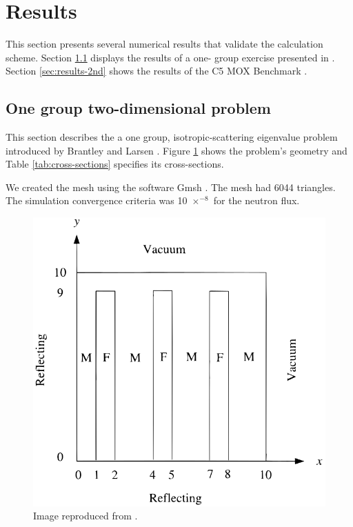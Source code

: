 \documentclass{anstrans}
\begin{document}
\section{Results}

This section presents several numerical results that validate the calculation scheme.
Section \ref{sec:results-1st} displays the results of a one- group exercise presented in \cite{brantley_simplifiedP3_2000}.
Section \ref{sec:results-2nd} shows the results of the C5 MOX Benchmark \cite{cavarec_benchmark_1994}.

\subsection{One group two-dimensional problem}
\label{sec:results-1st}

This section describes the a one group, isotropic-scattering eigenvalue problem introduced by Brantley and Larsen \cite{brantley_simplifiedP3_2000}.
Figure \ref{fig:2D} shows the problem's geometry and Table \ref{tab:cross-sections} specifies its cross-sections.

We created the mesh using the software Gmsh \cite{geuzaine_gmsh_2009}.
The mesh had 6044 triangles.
The simulation convergence criteria was 10 $\times ^{-8}$ for the neutron flux.

\begin{figure}[htbp!] %
    \centering
    \includegraphics[width=0.95\linewidth]{figures/brantley-larsen.png}
    \hfill
    \caption{Image reproduced from \cite{brantley_simplifiedP3_2000}.}
    \label{fig:2D}
\end{figure}
\end{document}

